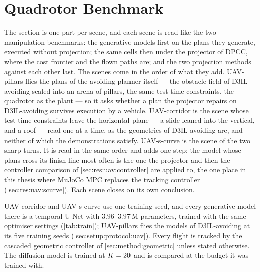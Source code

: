 \section{Quadrotor Benchmark}\label{sec:res:uav}

The section is one part per scene, and each scene is read like the two manipulation benchmarks: the
generative models first on the plans they generate, executed without projection; the same cells then under
the projector of \ac{DPCC}, where the cost frontier and the flown paths are; and the two projection methods
against each other last. The scenes come in the order of what they add. UAV-pillars flies the plans of the avoiding planner itself
--- the obstacle field of D3IL-avoiding scaled into an arena of pillars, the same test-time constraints, the
quadrotor as the plant --- so it asks whether a plan the projector repairs on D3IL-avoiding survives execution
by a vehicle. UAV-corridor is the scene whose test-time constraints leave the horizontal plane --- a slide leaned into
the vertical, and a roof --- read one at a time, as the geometries of D3IL-avoiding are, and neither of
which the demonstrations satisfy.
UAV-s-curve is the scene of the two sharp turns. It is read in the same order and adds one step: the model
whose plans cross its finish line most often is the one the projector and then the controller comparison
of \autoref{sec:res:uav:controller} are applied to, the one place in this thesis where MuJoCo MPC replaces
the tracking controller (\autoref{sec:res:uav:scurve}). Each scene closes on its own conclusion.

UAV-corridor and UAV-s-curve use one training seed, and every generative model there is a temporal U-Net
with $3.96$--$3.97$\,M parameters, trained with the same optimiser settings (\autoref{tab:train});
UAV-pillars flies the models of D3IL-avoiding at its five training seeds (\autoref{sec:setup:protocol:uav}).
Every flight is tracked by the cascaded geometric controller of \autoref{sec:method:geometric} unless
stated otherwise. The diffusion
model is trained at $K=20$ and is compared at the budget it was trained with.

